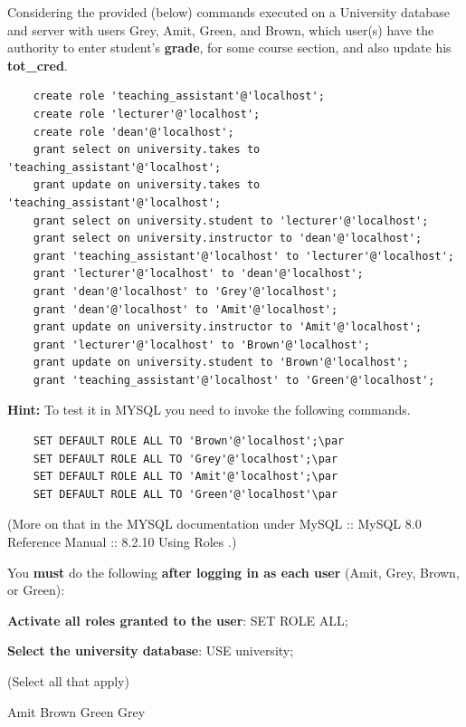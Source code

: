 \documentclass[12pt, addpoints]{exam}
\begin{document}
\begin{questions}
\begin{minipage}{\linewidth}
\question[4]
Considering the provided (below) commands executed on a University database and server with users Grey, Amit, Green, and Brown, 
which user(s) have the authority to enter student's \textbf{grade}, for some course section, and also update his \textbf{tot\_cred}.\par
\begin{verbatim}
    create role 'teaching_assistant'@'localhost';
    create role 'lecturer'@'localhost';
    create role 'dean'@'localhost';
    grant select on university.takes to 'teaching_assistant'@'localhost';
    grant update on university.takes to 'teaching_assistant'@'localhost';
    grant select on university.student to 'lecturer'@'localhost';
    grant select on university.instructor to 'dean'@'localhost';
    grant 'teaching_assistant'@'localhost' to 'lecturer'@'localhost';
    grant 'lecturer'@'localhost' to 'dean'@'localhost';
    grant 'dean'@'localhost' to 'Grey'@'localhost';
    grant 'dean'@'localhost' to 'Amit'@'localhost';
    grant update on university.instructor to 'Amit'@'localhost';
    grant 'lecturer'@'localhost' to 'Brown'@'localhost';
    grant update on university.student to 'Brown'@'localhost';
    grant 'teaching_assistant'@'localhost' to 'Green'@'localhost';
\end{verbatim}\par\vspace{0.5em}
\textbf{Hint: } To test it in MYSQL you need to invoke the following commands.\par
\begin{verbatim}
    SET DEFAULT ROLE ALL TO 'Brown'@'localhost';\par
    SET DEFAULT ROLE ALL TO 'Grey'@'localhost';\par
    SET DEFAULT ROLE ALL TO 'Amit'@'localhost';\par
    SET DEFAULT ROLE ALL TO 'Green'@'localhost'\par
\end{verbatim}
(More on that in the MYSQL documentation under MySQL :: MySQL 8.0 Reference Manual :: 8.2.10 Using Roles .)\par\vspace{0.5em}
You \textbf{must} do the following \textbf{after logging in as each user} (Amit, Grey, Brown, or Green):\par\vspace{0.5em}
\textbf{Activate all roles granted to the user}: SET ROLE ALL;\par
\textbf{Select the university database}: USE university;\par
(Select all that apply)\par\vspace{0.5em}
\begin{checkboxes}
    \choice Amit
    \CorrectChoice Brown
    \choice Green
    \choice Grey
\end{checkboxes}
\end{minipage}


\end{questions}
\end{document}
